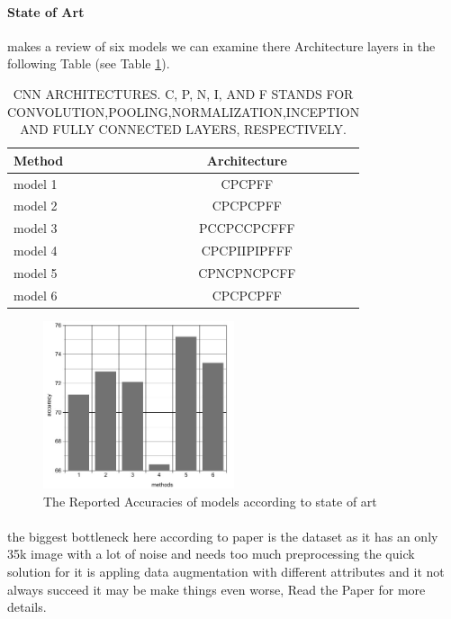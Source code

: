 \paragraph{State of Art}makes a review of six models we can examine there Architecture layers in the following Table (see Table \ref{models}).
\begin{table}
	\begin{center}
		\label{models}
		\caption{CNN ARCHITECTURES. C, P, N, I, AND F STANDS FOR CONVOLUTION,POOLING,NORMALIZATION,INCEPTION AND FULLY CONNECTED LAYERS, RESPECTIVELY. \newline}
		\begin{tabular}{l|c}
			\textbf{Method} & \textbf{Architecture} \\
			\hline
			model 1\cite{method_1} & CPCPFF \\
			model 2\cite{method_2} & CPCPCPFF \\
			model 3\cite{method_3} & PCCPCCPCFFF \\
			model 4\cite{method_4} & CPCPIIPIPFFF \\
			model 5\cite{method_5} & CPNCPNCPCFF \\						
			model 6\cite{method_6} & CPCPCPFF \\
		\end{tabular}
	\end{center}
\end{table}
\begin{figure}
	\centering
	\includegraphics[width=0.5\textwidth]{images/stateoart_acc.png}
	\caption{The Reported Accuracies of models according to state of art}
\end{figure}
\paragraph{}
the biggest bottleneck here according to paper is the dataset as it has an only 35k image with a lot of noise and needs too much preprocessing the quick solution for it is appling data augmentation with different attributes and it not always succeed it may be make things even worse, Read the Paper for more details\cite{state_of_art}.
